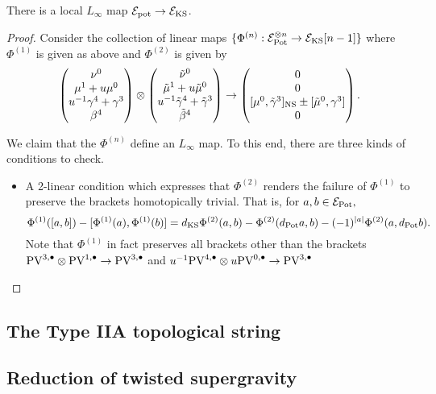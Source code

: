 \documentclass[11pt]{amsart}
\def\PV{{\rm PV}}
\begin{document}
\begin{prop}
There is a local $L_{\infty}$ map $\mathcal E_{\rm pot}\to \mathcal E_{\rm KS}$.
\end{prop}
\begin{proof}
  Consider the collection of linear maps $\{\Phi^{(n)}: \mathcal E_{\rm Pot}^{\otimes n}\to \mathcal E_{\rm KS}[n-1]\}$ where $\Phi^{(1)}$ is given as above and $\Phi^{{(2)}}$ is given by \[\begin{pmatrix}\nu^{0} \\ \mu^{1}+u\mu^{0} \\ u^{-1}\gamma^{4}+\gamma^{3} \\ \beta^{4}\end{pmatrix}\otimes \begin{pmatrix}\tilde{\nu}^{0} \\ \tilde{\mu}^{1}+u\tilde{\mu}^{0}\\ u^{-1}\tilde{\gamma}^{4}+\tilde{\gamma}^{3} \\ \tilde{\beta}^{4} \end{pmatrix}\to \begin{pmatrix} 0 \\ 0 \\ [\mu^{0},\tilde{\gamma}^{3}]_{\rm NS}\pm [\tilde{\mu}^{0},\gamma^{3}] \\ 0\end{pmatrix}.\]

  We claim that the $\Phi^{(n)}$ define an $L_{\infty}$ map. To this end, there are three kinds of conditions to check.
  \begin{itemize}
    \item A 2-linear condition which expresses that $\Phi^{(2)}$ renders the failure of $\Phi^{(1)}$ to preserve the brackets homotopically trivial. That is, for $a,b\in\mathcal E_{\rm Pot},$ \[\Phi^{(1)}([a,b])-[\Phi^{(1)}(a),\Phi^{(1)}(b)]=d_{\rm KS}\Phi^{(2)}(a,b)-\Phi^{(2)}(d_{\rm Pot}a, b)-(-1)^{|a|}\Phi^{(2)}(a,d_{\rm Pot}b).\] Note that $\Phi^{(1)}$ in fact preserves all brackets other than the brackets $\PV^{3,\bu}\otimes \PV^{1,\bu}\to \PV^{3,\bu}$ and $u^{-1}\PV^{4,\bu}\otimes u\PV^{0,\bu}\to \PV^{3,\bu}$
  \end{itemize}
\end{proof}

\subsection{The Type IIA topological string}
\label{IIAtop}
\subsection{Reduction of twisted supergravity}
\label{sec:orgcf7b6a4}
\end{document}
